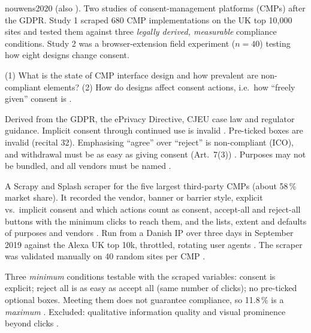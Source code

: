 \begin{papercard}{nouwens2020}
   (also  ). Two studies of consent-management platforms (CMPs) after the GDPR. Study 1 scraped 680 CMP implementations on the UK top 10,000 sites and tested them against three \emph{legally derived, measurable} compliance conditions. Study 2 was a browser-extension field experiment ($n=40$) testing how eight designs change consent.

 (1) What is the state of CMP interface design and how prevalent are non-compliant elements? (2) How do designs affect consent actions, i.e.\ how ``freely given'' consent is .

 Derived from the GDPR, the ePrivacy Directive, CJEU case law and regulator guidance. Implicit consent through continued use is invalid . Pre-ticked boxes are invalid (recital 32). Emphasising ``agree'' over ``reject'' is non-compliant (ICO), and withdrawal must be as easy as giving consent (Art.\ 7(3)) . Purposes may not be bundled, and all vendors must be named .

 A Scrapy and Splash scraper for the five largest third-party CMPs (about 58\,\% market share). It recorded the vendor, banner or barrier style, explicit vs.\ implicit consent and which actions count as consent, accept-all and reject-all buttons with the minimum clicks to reach them, and the lists, extent and defaults of purposes and vendors . Run from a Danish IP over three days in September 2019 against the Alexa UK top 10k, throttled, rotating user agents . The scraper was validated manually on 40 random sites per CMP .

 Three \emph{minimum} conditions testable with the scraped variables: consent is explicit; reject all is as easy as accept all (same number of clicks); no pre-ticked optional boxes. Meeting them does not guarantee compliance, so 11.8\,\% is a \emph{maximum} . Excluded: qualitative information quality and visual prominence beyond clicks .


\end{papercard}
